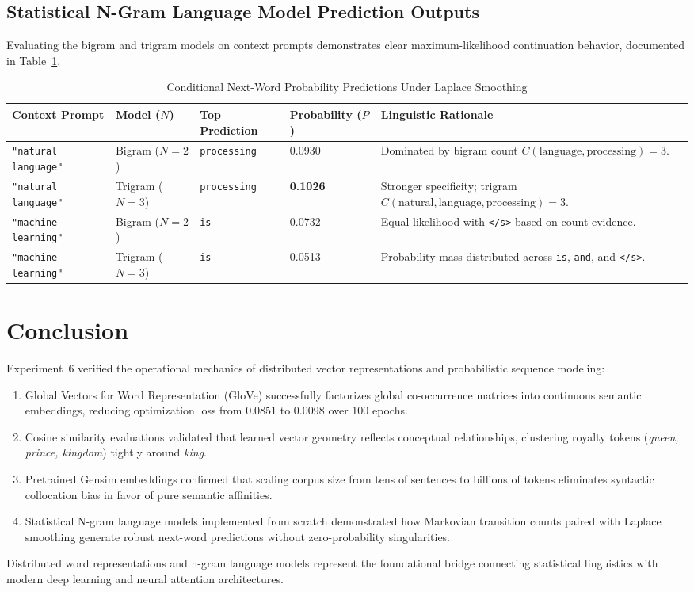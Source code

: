 \subsection{Statistical N-Gram Language Model Prediction Outputs}
Evaluating the bigram and trigram models on context prompts demonstrates clear maximum-likelihood continuation behavior, documented in Table~\ref{tab:exp6_ngram_results}.
\begin{table}[H]
\centering
\small
\caption{Conditional Next-Word Probability Predictions Under Laplace Smoothing}
\label{tab:exp6_ngram_results}
\begin{tabularx}{\textwidth}{llllX}
\toprule
\textbf{Context Prompt} & \textbf{Model ($N$)} & \textbf{Top Prediction} & \textbf{Probability ($P$)} & \textbf{Linguistic Rationale} \\
\midrule
\texttt{"natural language"} & Bigram ($N=2$) & \texttt{processing} & 0.0930 & Dominated by bigram count $C(\text{language}, \text{processing})=3$. \\
\texttt{"natural language"} & Trigram ($N=3$) & \texttt{processing} & \textbf{0.1026} & Stronger specificity; trigram $C(\text{natural}, \text{language}, \text{processing})=3$. \\
\texttt{"machine learning"} & Bigram ($N=2$) & \texttt{is} & 0.0732 & Equal likelihood with \texttt{</s>} based on count evidence. \\
\texttt{"machine learning"} & Trigram ($N=3$) & \texttt{is} & 0.0513 & Probability mass distributed across \texttt{is}, \texttt{and}, and \texttt{</s>}. \\
\bottomrule
\end{tabularx}
\end{table}

\section{Conclusion}
Experiment~6 verified the operational mechanics of distributed vector representations and probabilistic sequence modeling:
\begin{enumerate}
    \item Global Vectors for Word Representation (GloVe) successfully factorizes global co-occurrence matrices into continuous semantic embeddings, reducing optimization loss from 0.0851 to 0.0098 over 100 epochs.
    \item Cosine similarity evaluations validated that learned vector geometry reflects conceptual relationships, clustering royalty tokens (\textit{queen, prince, kingdom}) tightly around \textit{king}.
    \item Pretrained Gensim embeddings confirmed that scaling corpus size from tens of sentences to billions of tokens eliminates syntactic collocation bias in favor of pure semantic affinities.
    \item Statistical N-gram language models implemented from scratch demonstrated how Markovian transition counts paired with Laplace smoothing generate robust next-word predictions without zero-probability singularities.
\end{enumerate}
Distributed word representations and n-gram language models represent the foundational bridge connecting statistical linguistics with modern deep learning and neural attention architectures.
